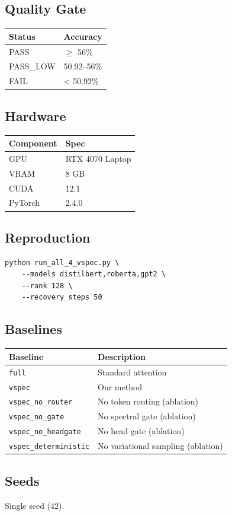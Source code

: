 \subsection{Quality Gate}

\begin{table}[H]
\centering
\small
\begin{tabular}{ll}
\toprule
\textbf{Status} & \textbf{Accuracy} \\
\midrule
PASS & $\ge$ 56\% \\
PASS\_LOW & 50.92--56\% \\
FAIL & < 50.92\% \\
\bottomrule
\end{tabular}
\end{table}

\subsection{Hardware}

\begin{table}[H]
\centering
\small
\begin{tabular}{ll}
\toprule
\textbf{Component} & \textbf{Spec} \\
\midrule
GPU & RTX 4070 Laptop \\
VRAM & 8 GB \\
CUDA & 12.1 \\
PyTorch & 2.4.0 \\
\bottomrule
\end{tabular}
\end{table}

\subsection{Reproduction}

\begin{lstlisting}
python run_all_4_vspec.py \
    --models distilbert,roberta,gpt2 \
    --rank 128 \
    --recovery_steps 50
\end{lstlisting}

\subsection{Baselines}

\begin{table}[H]
\centering
\small
\begin{tabular}{ll}
\toprule
\textbf{Baseline} & \textbf{Description} \\
\midrule
\texttt{full} & Standard attention \\
\texttt{vspec} & Our method \\
\texttt{vspec\_no\_router} & No token routing (ablation) \\
\texttt{vspec\_no\_gate} & No spectral gate (ablation) \\
\texttt{vspec\_no\_headgate} & No head gate (ablation) \\
\texttt{vspec\_deterministic} & No variational sampling (ablation) \\
\bottomrule
\end{tabular}
\end{table}

\subsection{Seeds}

Single seed (42).

